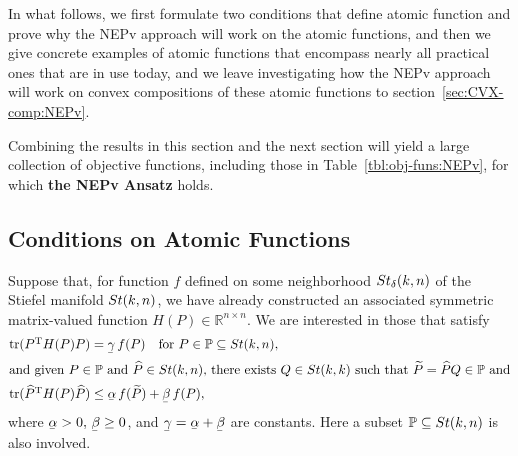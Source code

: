 \documentclass[11pt]{article}
\def\bbP{\mathbb{P}}
\def\bbR{\mathbb{R}}
\def\wtd{\widetilde}
\def\what{\widehat}
\newcommand\munderbar[1]{%
  \underaccent{\bar}{#1}}
\newcommand\STM[2]{{\rm St}(#1,#2)}
\newcommand\STMnbr{{\rm St}_{\delta}(k,n)}
\DeclareMathOperator{\tr}{tr}
\DeclareMathOperator{\T}{T}
\theoremstyle{definition}
\numberwithin{equation}{section}
\begin{document}

In what follows, we first formulate two conditions that define
atomic function and prove why the NEPv approach will work on the atomic functions, and then we give concrete examples of
atomic functions that encompass nearly all practical ones that are in use today,  and we leave
investigating how the NEPv approach will work on convex compositions of these atomic functions to section~\ref{sec:CVX-comp:NEPv}.

Combining the results in this section and the next section will yield
a large collection of objective functions, including those in Table~\ref{tbl:obj-funs:NEPv}, for which
{\bf the NEPv Ansatz} holds.

\subsection{Conditions on Atomic Functions}\label{ssec:AF-NEPv}
Suppose that, for  function $f$ defined on some neighborhood $\STMnbr$ of the Stiefel manifold $\STM{k}{n}$,
we have already constructed an associated symmetric matrix-valued function $H(P)\in\bbR^{n\times n}$.
%
We are interested in those
that satisfy
\begin{subequations}\label{eq:cond4AF-NEPv}
\begin{align}
\tr(P^{\T}H(P)P)&=\munderbar\gamma\, f(P)\quad\mbox{for $P\in\bbP\subseteq\STM{k}{n}$},
              \label{eq:cond4AF-NEPv-a} \\
\intertext{and given $P\in\bbP$ and $\what P\in\STM{k}{n}$, there exists $Q\in\STM{k}{k}$ such
that $\wtd P=\what PQ\in\bbP$ and}
\tr(\what P^{\T}H(P)\what P)&\le\munderbar\alpha \,f(\wtd P)+\munderbar\beta \,f(P),
      \label{eq:cond4AF-NEPv-b}
\end{align}
\end{subequations}
where $\munderbar\alpha>0,\,\munderbar\beta\ge 0$,  and $\munderbar\gamma=\munderbar\alpha+\munderbar\beta$ are constants.
Here  a subset $\bbP\subseteq\STM{k}{n}$ is also involved.
\end{document}
